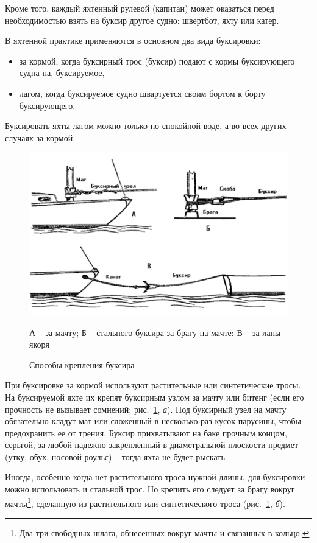 \documentclass[a4paper, 12pt, twoside, final]{scrbook}
\begin{document}
Кроме того, каждый яхтенный рулевой (капитан) может оказаться перед необходимостью взять на буксир другое судно: швертбот, яхту или катер.

В яхтенной практике применяются в основном два вида буксировки:

\begin{itemize}
\item за кормой, когда буксирный трос (буксир) подают с кормы буксирующего судна на, буксируемое,
\item лагом, когда буксируемое судно швартуется своим бортом к борту буксирующего.
\end{itemize}

Буксировать яхты лагом можно только по спокойной воде, а во всех других случаях за кормой.

\begin{figure}[htbp]
   \centering
   \includegraphics{137_Krepl_buksira} %
   \caption{Способы крепления буксира}
   \label{fig:137}
   \centering\small
   А \--- за мачту; Б \--- стального буксира за брагу на мачте: В \--- за лапы якоря
\end{figure}

При буксировке за кормой используют растительные или синтетические тросы. На буксируемой яхте их крепят буксирным узлом за мачту или битенг (если его прочность не вызывает сомнений; рис.~\ref{fig:137}, \textit{а}). Под буксирный узел на мачту обязательно кладут мат или сложенный в несколько раз кусок парусины, чтобы предохранить ее от трения. Буксир прихватывают на баке прочным концом, серьгой, за любой надежно закрепленный в диаметральной плоскости предмет (утку, обух, носовой роульс) \--- тогда яхта не будет рыскать.

Иногда, особенно когда нет растительного троса нужной длины, для буксировки можно использовать и стальной трос. Но крепить его следует за брагу вокруг мачты\footnote{Два-три свободных шлага, обнесенных вокруг мачты и связанных в кольцо.}, сделанную из растительного или синтетического троса (рис.~\ref{fig:137}, \textit{б}).
\end{document}

